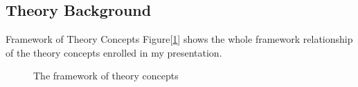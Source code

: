 \documentclass{beamer}
\theoremstyle{definition}
\begin{document}



\subsection{Theory Background}

\begin{frame}{Framework of Theory Concepts}
Figure[\ref{fig:pipeline}] shows the whole framework relationship of the theory concepts enrolled in my presentation.
\begin{figure}
\centering
{}
\caption{The framework of theory concepts}
\label{fig:pipeline}
\end{figure}

\end{frame}
\end{document}

